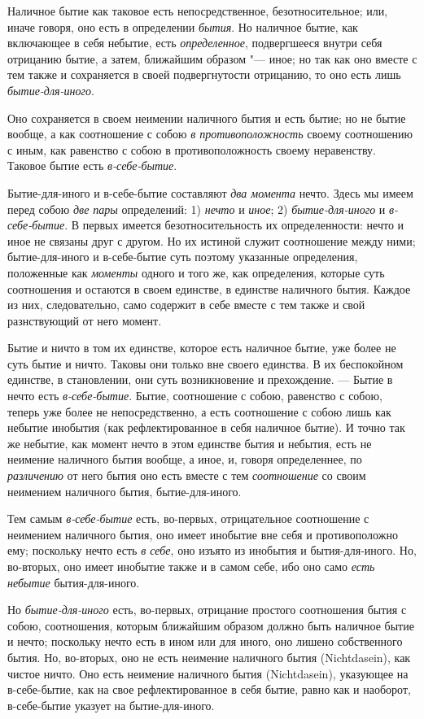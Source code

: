 Наличное бытие как таковое есть непосредственное, безотносительное; или,
иначе говоря, оно есть в определении {\em бытия}. Но
наличное бытие, как включающее в себя небытие, есть
{\em определенное}, подвергшееся внутри себя отрицанию
бытие, а затем, ближайшим образом "--- иное; но так как оно вместе с тем
также и сохраняется в своей подвергнутости отрицанию, то оно есть лишь
{\em бытие-для-иного}.

Оно сохраняется в своем неимении наличного бытия и есть бытие; но не бытие
вообще, а как соотношение с собою {\em в
противоположность} своему соотношению с иным, как равенство с собою в
противоположность своему неравенству. Таковое бытие есть
{\em в-себе-бытие}.

Бытие-для-иного и в-себе-бытие составляют {\em два
момента} нечто. Здесь мы имеем перед собою {\em две
пары} определений: 1) {\em нечто} и
{\em иное}; 2) {\em бытие-для-иного} и {\em в-себе-бытие}. В первых имеется
безотносительность их определенности: нечто и иное не связаны друг с
другом. Но их истиной служит соотношение между ними; бытие-для-иного и
в-себе-бытие суть поэтому указанные определения, положенные как
{\em моменты} одного и того же, как определения,
которые суть соотношения и остаются в своем единстве, в единстве наличного
бытия. Каждое из них, следовательно, само содержит в себе вместе с тем
также и свой разнствующий от него момент.

Бытие и ничто в том их единстве, которое есть наличное бытие, уже более не
суть бытие и ничто. Таковы они только вне своего единства. В их беспокойном
единстве, в становлении, они суть возникновение и прехождение. — Бытие в
нечто есть {\em в-себе-бытие}. Бытие, соотношение с
собою, равенство с собою, теперь уже более не непосредственно, а есть
соотношение с собою лишь как небытие инобытия (как рефлектированное в себя
наличное бытие). И точно так же небытие, как момент нечто в этом единстве
бытия и небытия, есть не неимение наличного бытия вообще, а иное, и,
говоря определеннее, по {\em различению} от него бытия
оно есть вместе с тем {\em соотношение} со своим
неимением наличного бытия, бытие-для-иного.

Тем самым {\em в-себе-бытие} есть, во-первых,
отрицательное соотношение с неимением наличного бытия, оно имеет инобытие
вне себя и противоположно ему; поскольку нечто есть
{\em в себе}, оно изъято из инобытия и бытия-для-иного. 
Но, во-вторых, оно имеет инобытие также и в самом себе, ибо оно
само {\em есть небытие} бытия-для-иного.

Но {\em бытие-для-иного} есть, во-первых, отрицание
простого соотношения бытия с собою, соотношения, которым ближайшим образом
должно быть наличное бытие и нечто; поскольку нечто есть в ином 
или для иного, оно лишено собственного бытия. Но, во-вторых,
оно не есть неимение наличного бытия (Nichtdasein), как чистое ничто. Оно
есть неимение наличного бытия (Nichtdasein), указующее на в-себе-бытие, как
на свое рефлектированное в себя бытие, равно как и наоборот, в-себе-бытие
указует на бытие-для-иного.

